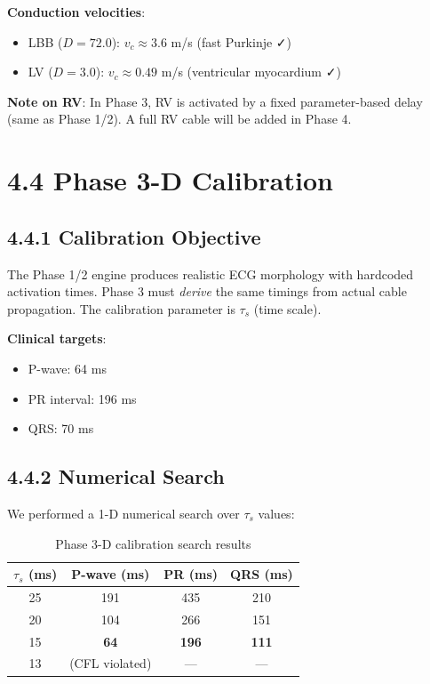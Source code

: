 \textbf{Conduction velocities}:

\begin{itemize}
  \item LBB ($D = 72.0$): $v_c \approx 3.6$ m/s (fast Purkinje ✓)
  \item LV ($D = 3.0$): $v_c \approx 0.49$ m/s (ventricular myocardium ✓)
\end{itemize}

\textbf{Note on RV}: In Phase 3, RV is activated by a fixed parameter-based delay (same as Phase 1/2). A full RV cable will be added in Phase 4.

\section{4.4 Phase 3-D Calibration}

\subsection{4.4.1 Calibration Objective}

The Phase 1/2 engine produces realistic ECG morphology with hardcoded activation times. Phase 3 must \emph{derive} the same timings from actual cable propagation. The calibration parameter is $\tau_s$ (time scale).

\textbf{Clinical targets}:

\begin{itemize}
  \item P-wave: 64 ms
  \item PR interval: 196 ms
  \item QRS: 70 ms
\end{itemize}

\subsection{4.4.2 Numerical Search}

We performed a 1-D numerical search over $\tau_s$ values:

\begin{table}[H]
\centering
\begin{tabularx}{\textwidth}{|c|c|c|c|}
\hline
$\tau_s$ (ms) & P-wave (ms) & PR (ms) & QRS (ms) \\
\hline
25 & 191 & 435 & 210 \\
20 & 104 & 266 & 151 \\
15 & \textbf{64} & \textbf{196} & \textbf{111} \\
13 & (CFL violated) & — & — \\
\hline
\end{tabularx}
\caption{Phase 3-D calibration search results}
\label{tab:calibration_search}
\end{table}

